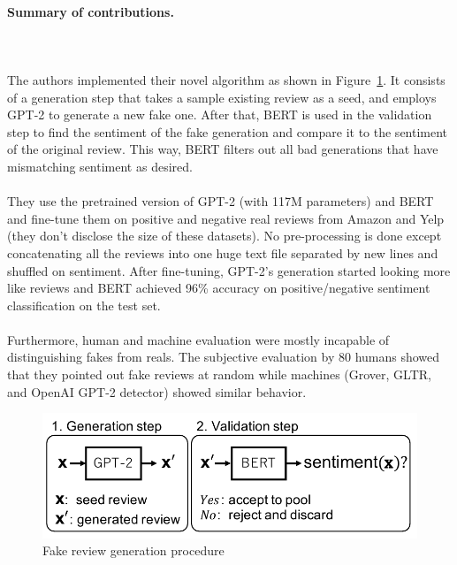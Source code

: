 \documentclass{article}
\begin{document}
\paragraph{Summary of contributions.}$ $
\\\\ The authors implemented their novel algorithm as shown in Figure~\ref{Fig:fake_review_attack}.  It consists of a generation step that takes a sample existing review as a seed,  and employs GPT-2 to generate a new fake one.  After that,  BERT is used in the validation step to find the sentiment of the fake generation and compare it to the sentiment of the original review.  This way,  BERT filters out all bad generations that have mismatching sentiment as desired. 
\\\\ They use the pretrained version of GPT-2 (with 117M parameters) and BERT and fine-tune them on positive and negative real reviews from Amazon and Yelp (they don't disclose the size of these datasets).  No pre-processing is done except concatenating all the reviews into one huge text file separated by new lines and shuffled on sentiment.  After fine-tuning,  GPT-2's generation started looking more like reviews and BERT achieved 96\% accuracy on positive/negative sentiment classification on the test set.    
\\\\ Furthermore,  human and machine evaluation were mostly incapable of distinguishing fakes from reals.  The subjective evaluation by 80 humans showed that they pointed out fake reviews at random while machines (Grover,  GLTR,  and OpenAI GPT-2 detector) showed similar behavior.
\begin{figure}[tb]
 \centering
\includegraphics[width=0.7\columnwidth]{approach.pdf}
\vspace{-4mm}
\caption{Fake review generation procedure}
\label{Fig:fake_review_attack}
\vspace{-3mm}
\end{figure}
\end{document}
